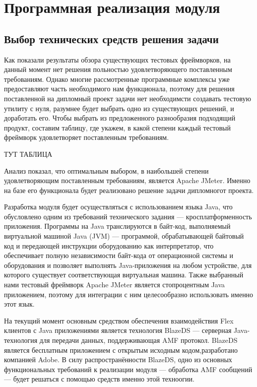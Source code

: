 \chapter{Программная реализация модуля}

\section{Выбор технических средств решения задачи}

Как показали результаты обзора существующих тестовых фреймворков, на данный момент нет решения польностью
удовлетворяющего поставленным требованиям. Однако многие рассмотренные программные комплексы уже предоставляют часть
необходимого нам функционала, поэтому для решения поставленной на дипломный
проект задачи нет необходимсти создавать тестовую утилиту с нуля, разумнее
будет выбрать одно из существующих решений, и доработать его.
Чтобы выбрать из предложенного разнообразия подходящий продукт, составим таблицу, где укажем, в какой степени каждый
тестовый фреймворк удовлетворяет поставленным требованиям.

ТУТ ТАБЛИЦА

Анализ показал, что оптимальным выбором, в наибольшей степени удовлетворяющим поставленным требованиям, является
Apache JMeter. Именно на базе его функционала будет реализовано решение задачи дипломногот проекта.

Разработка модуля будет осуществляться с использованием языка Java, что обусловлено одним из требований технического
задания --- кросплатформенность приложения. Программы на Java транслируются в байт-код, выполняемый виртуальной машиной
Java (JVM) --- программой, обрабатывающей байтовый код и передающей инструкции оборудованию как интерпретатор, что
обеспечивает полную независимости байт-кода от операционной системы и оборудования и позволяет выполнять
Java-приложения на любом устройстве, для которого существует соответствующая виртуальная машина. Также выбранный нами
тестовый фреймворк Apache JMeter является стопроцентным Java приложением, поэтому для интеграции с ним целесообразно
использовать именно этот язык.

На текущий момент основным средством обеспечения взаимодействия Flex клиентов с Java приложениями является технология
BlazeDS --- серверная Java-технология для передачи данных, поддерживающая AMF протокол. BlazeDS является бесплатным
приложением с открытым исходным кодом,разработано компанией Adobe. В силу распространённости BlazeDS, одно из основных
функциональных требований к реализации модуля --- обработка AMF сообщений --- будет решаться с помощью средств именно
этой техноогии.

